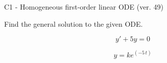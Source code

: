\begin{exercise}
  \begin{exerciseTitle}C1 - Homogeneous first-order linear ODE (ver. 49)\end{exerciseTitle}
  \begin{exerciseStatement}
    
Find the general solution to the given ODE.

    
\[y'+5y=0\]

  \end{exerciseStatement}
  \begin{exerciseAnswer}
    
\[y= k e^{\left(-5 \, t\right)}\]

  \end{exerciseAnswer}
\end{exercise}
